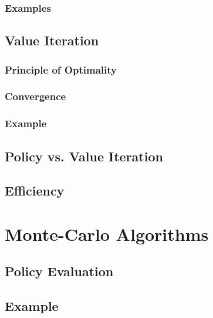 		\subsection{Examples} %

	\section{Value Iteration} %

		\subsection{Principle of Optimality} %

		\subsection{Convergence} %

		\subsection{Example} %

	\section{Policy vs. Value Iteration} %

	\section{Efficiency} %

\chapter{Monte-Carlo Algorithms} %

	\section{Policy Evaluation} %

	\section{Example} %

